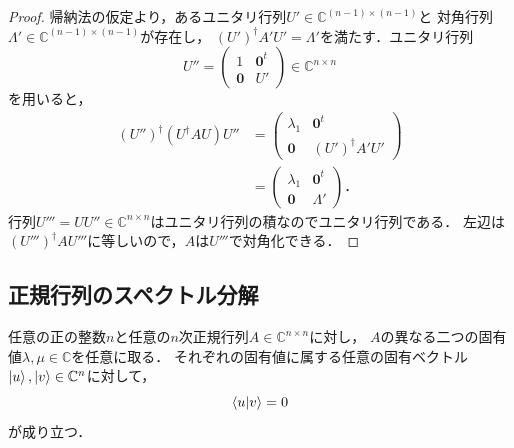 \begin{proof}
  帰納法の仮定より，あるユニタリ行列$U'\in\mathbb C^{(n-1)\times(n-1)}$と
  対角行列$\Lambda'\in\mathbb C^{(n-1)\times(n-1)}$が存在し，
  $(U')^\dagger A'U'=\Lambda'$を満たす．ユニタリ行列
  \begin{equation*}
    U''=\begin{pmatrix}1&\bm 0^t\\\bm 0&U'\end{pmatrix}\in\mathbb C^{n\times n}
  \end{equation*}
  を用いると，
  \begin{align*}
    (U'')^\dagger(U^\dagger AU)U''
      &=\begin{pmatrix}\lambda_1&\bm 0^t\\\bm 0&(U')^\dagger A'U'\end{pmatrix}\\
      &=\begin{pmatrix}\lambda_1&\bm 0^t\\\bm 0&\Lambda'\end{pmatrix}．
  \end{align*}
  行列$U'''=UU''\in\mathbb C^{n\times n}$はユニタリ行列の積なのでユニタリ行列である．
  左辺は$(U''')^\dagger AU'''$に等しいので，$A$は$U'''$で対角化できる．
\end{proof}

\subsection{正規行列のスペクトル分解}

\begin{theo}[正規行列の固有ベクトルの直交性]
  \label{theo:normal-eigenvector-orthogonality}
  任意の正の整数$n$と任意の$n$次正規行列$A\in\mathbb C^{n\times n}$に対し，
  $A$の異なる二つの固有値$\lambda,\mu\in\mathbb C$を任意に取る．
  それぞれの固有値に属する任意の固有ベクトル$\ket{u},\ket{v}\in\mathbb C^n$に対して，
  \begin{equation*}
    \braket{u|v}=0
  \end{equation*}
  が成り立つ．
\end{theo}

